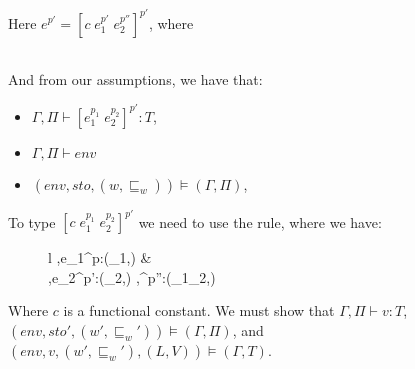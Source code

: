 \item[\runa{App-const}] Here $e^{p'}=[ c\;e_1^{p'}\;e_2^{p''}]^{p'}$, where
\begin{figure}[H]
	\setlength\tabcolsep{8pt}
	\begin{tabular}{l}
		
	\end{tabular}
\end{figure}

And from our assumptions, we have that:
\begin{itemize}
	\item $\Gamma,\Pi\vdash \left[e_1^{p_1}\;e_2^{p_2}\right]^{p'}:T$,
	\item $\Gamma,\Pi\vdash env$
	\item $(env,sto,(w,\sqsubseteq_w))\models(\Gamma,\Pi)$,
\end{itemize}

To type $[c\;e_1^{p_1}\;e_2^{p_2}]^{p'}$ we need to use the  rule, where we have:
\begin{figure}[H]
	\setlength\tabcolsep{8pt}
	\begin{tabular}{l}
	\inference[]
	{
		\Gamma,\Pi\vdash e_1^{p}:(\delta_1,\emptyset) &\\
		\Gamma,\Pi\vdash e_2^{p'}:(\delta_2,\emptyset)
	}
	{\Gamma,\Pi\vdash [c\;e_1^{p} \; e_2^{p'}]^{p''}:(\delta_1\cup\delta_2,\emptyset)}
	\end{tabular}
\end{figure}
Where $c$ is a functional constant.
We must show that  $\Gamma,\Pi\vdash v:T$, \\
 $(env,sto',(w',\sqsubseteq_w'))\models(\Gamma,\Pi)$, and  $(env,v,(w',\sqsubseteq_w'),(L,V))\models(\Gamma,T)$.

